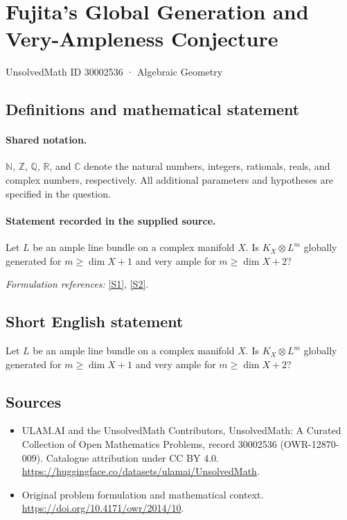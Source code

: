 \documentclass[11pt]{article}
\newcommand{\sref}[2]{\hyperlink{source:#1:#2}{[S#2]}}
\begin{document}
\setcounter{section}{30002535}
\section{Fujita's Global Generation and Very-Ampleness Conjecture}\label{30002536}
{\small UnsolvedMath ID 30002536 · Algebraic Geometry}
\subsection{Definitions and mathematical statement}

\paragraph{Shared notation.}$\mathbb N$, $\mathbb Z$, $\mathbb Q$, $\mathbb R$, and $\mathbb C$ denote the natural numbers, integers, rationals, reals, and complex numbers, respectively. All additional parameters and hypotheses are specified in the question.


\paragraph{Statement recorded in the supplied source.}
Let $L$ be an ample line bundle on a complex manifold $X$. Is $K_X\otimes L^m$ globally generated for $m\geq\dim X+1$ and very ample for $m\geq\dim X+2$?
\par\smallskip\textit{Formulation references:} \sref{30002536}{1}, \sref{30002536}{2}.
\subsection{Short English statement}
Let $L$ be an ample line bundle on a complex manifold $X$. Is $K_X\otimes L^m$ globally generated for $m\geq\dim X+1$ and very ample for $m\geq\dim X+2$?
\subsection{Sources}
\begin{itemize}
\item[\hypertarget{source:30002536:1}{S1}] ULAM.AI and the UnsolvedMath Contributors, UnsolvedMath: A Curated Collection of Open Mathematics Problems, record 30002536 (OWR-12870-009). Catalogue attribution under CC BY 4.0.
\url{https://huggingface.co/datasets/ulamai/UnsolvedMath}.
\item[\hypertarget{source:30002536:2}{S2}] Original problem formulation and mathematical context.
\url{https://doi.org/10.4171/owr/2014/10}.
\end{itemize}
\label{end:30002536}
\end{document}
